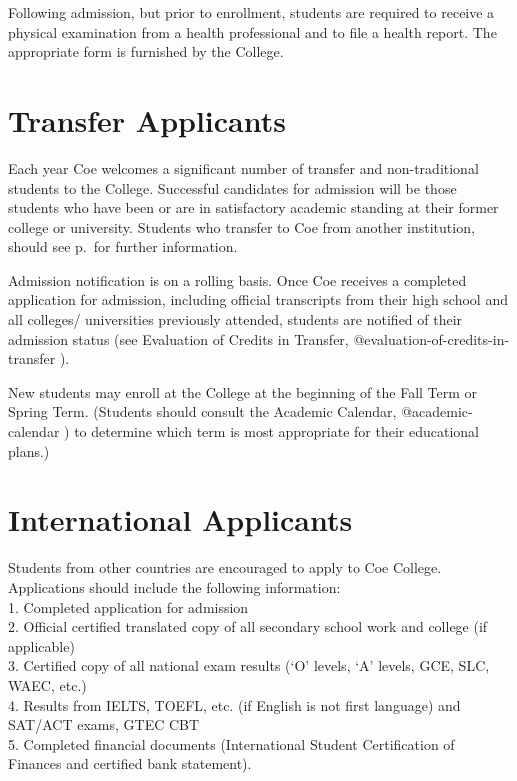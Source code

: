 \documentclass[
  letterpaper,
]{scrbook}
\begin{document}
Following admission, but prior to enrollment, students are required to
receive a physical examination from a health professional and to file a
health report. The appropriate form is furnished by the College.

\section{Transfer Applicants}\label{transfer-applicants}

Each year Coe welcomes a significant number of transfer and
non-traditional students to the College. Successful candidates for
admission will be those students who have been or are in satisfactory
academic standing at their former college or university. Students who
transfer to Coe from another institution, should see p.~for further
information.

Admission notification is on a rolling basis. Once Coe receives a
completed application for admission, including official transcripts from
their high school and all colleges/ universities previously attended,
students are notified of their admission status (see Evaluation of
Credits in Transfer, @evaluation-of-credits-in-transfer ).

New students may enroll at the College at the beginning of the Fall Term
or Spring Term. (Students should consult the Academic Calendar,
@academic-calendar ) to determine which term is most appropriate for
their educational plans.)

\section{International Applicants}\label{international-applicants}

Students from other countries are encouraged to apply to Coe College.
Applications should include the following information:\\
1. Completed application for admission\\
2. Official certified translated copy of all secondary school work and
college (if applicable)\\
3. Certified copy of all national exam results (`O' levels, `A' levels,
GCE, SLC, WAEC, etc.)\\
4. Results from IELTS, TOEFL, etc. (if English is not first language)
and SAT/ACT exams, GTEC CBT\\
5. Completed financial documents (International Student Certification of
Finances and certified bank statement).
\end{document}
